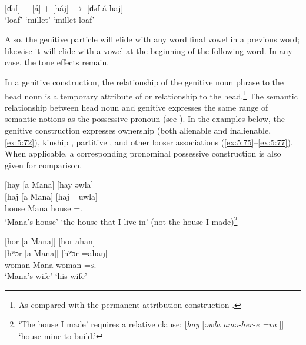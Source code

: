 \ea \label{ex:5:71}
\textup{[ɗ\={a}f]  +  [á]  +  [háj]    $\rightarrow$   [ɗ\={ə}f á h\={a}j]}\\
\glt  ‘loaf’  \hspace{6pt}  {\GEN}  \hspace{1pt}  ‘millet’   \hspace{3pt}    ‘millet loaf’
\z

Also, the genitive particle will elide with any word final vowel in a previous word; likewise it will elide with a vowel at the beginning of the following word. In any case, the tone effects remain.

\largerpage In a genitive construction, the relationship of the genitive noun phrase to the head  noun is a temporary attribute of or relationship to the head.\footnote{As compared with the permanent attribution construction .} The semantic relationship between head noun and genitive expresses the same range of semantic notions as the possessive pronoun (see ). In the examples below, the genitive construction expresses ownership (both alienable and inalienable, \ref{ex:5:72}), kinship , partitive , and other looser associations (\ref{ex:5:75}--\ref{ex:5:77}). When applicable, a corresponding pronominal possessive construction is also given for comparison. 

\ea \label{ex:5:72}
{}[hay [a  Mana]  \hspace{43pt}  [hay əwla]\\  
\gll {}[haj    [a   Mana]  \hspace{30pt}     [haj   =uwla]  \\
house    {\GEN}  Mana   \hspace{30pt}    house   ={\oneS}.{\POSS}\\
\glt ‘Mana’s house’  \hspace{42pt}       ‘the house that I live in’ (not the house I  made)\footnote{‘The house I made’ requires a relative clause: [\textit{hay} [\textit{əwla      amə-her-e  =va }]] ‘house mine to build.’}
\z


\ea \label{ex:5:73}
{}[hor  [a  Mana]]  \hspace{42pt}     [hor  ahan]\\
\gll  {}[hʷɔr   [a   Mana]]  \hspace{20pt}     [hʷɔr  =ahaŋ]\\
      woman    {\GEN}    Mana   \hspace{20pt}    woman  =\textsc{s}.{\POSS}\\
\glt  ‘Mana’s wife’   \hspace{50pt}      ‘his wife’
\z

